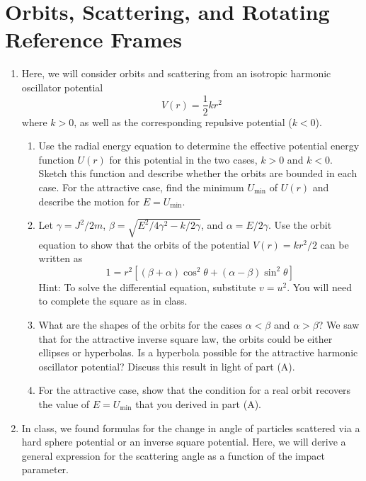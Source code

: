 \documentclass[../psets.tex]{subfiles}
\begin{document}
\section{Orbits, Scattering, and Rotating Reference Frames}
\begin{enumerate}
    \item {}Here, we will consider orbits and scattering from an isotropic harmonic oscillator potential
    \begin{equation*}
        V(r) = \frac{1}{2}kr^2
    \end{equation*}
    where $k>0$, as well as the corresponding repulsive potential ($k<0$).
    \begin{enumerate}
        \item Use the radial energy equation to determine the effective potential energy function $U(r)$ for this potential in the two cases, $k>0$ and $k<0$. Sketch this function and describe whether the orbits are bounded in each case. For the attractive case, find the minimum $U_\text{min}$ of $U(r)$ and describe the motion for $E=U_\text{min}$.
        \item Let $\gamma=J^2/2m$, $\beta=\sqrt{E^2/4\gamma^2-k/2\gamma}$, and $\alpha=E/2\gamma$. Use the orbit equation to show that the orbits of the potential $V(r)=kr^2/2$ can be written as
        \begin{equation*}
            1 = r^2[(\beta+\alpha)\cos^2\theta+(\alpha-\beta)\sin^2\theta]
        \end{equation*}
        Hint: To solve the differential equation, substitute $v=u^2$. You will need to complete the square as in class.
        \item What are the shapes of the orbits for the cases $\alpha<\beta$ and $\alpha>\beta$? We saw that for the attractive inverse square law, the orbits could be either ellipses or hyperbolas. Is a hyperbola possible for the attractive harmonic oscillator potential? Discuss this result in light of part (A).
        \item For the attractive case, show that the condition for a real orbit recovers the value of $E=U_\text{min}$ that you derived in part (A).
    \end{enumerate}
    \item In class, we found formulas for the change in angle of particles scattered via a hard sphere potential or an inverse square potential. Here, we will derive a general expression for the scattering angle as a function of the impact parameter.
    \begin{enumerate}

\end{enumerate}
\end{enumerate}
\end{document}
